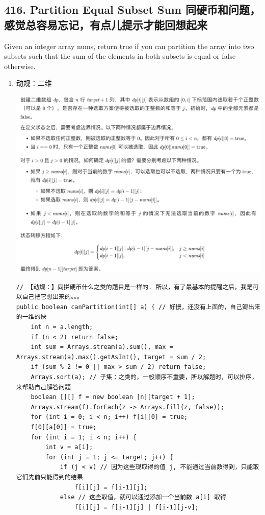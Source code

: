 \documentclass[9pt, b5paaper]{book}
\begin{document}
\subsection{416. Partition Equal Subset Sum 同硬币和问题，感觉总容易忘记，有点儿提示才能回想起来}
\label{sec-1-7-2}
Given an integer array nums, return true if you can partition the array into two subsets such that the sum of the elements in both subsets is equal or false otherwise.
\begin{enumerate}
\item 动规：二维
\label{sec-1-7-2-1}

\includegraphics[width=.9\linewidth]{./pic/dp_20230419_141627.png}
\begin{verbatim}
// 【动规：】同拼硬币什么之类的题目是一样的. 所以，有了最基本的提醒之后，我是可以自己把它想出来的。。。
public boolean canPartition(int[] a) { // 好慢，还没有上面的，自己瓣出来的一维的快
    int n = a.length;
    if (n < 2) return false;
    int sum = Arrays.stream(a).sum(), max = Arrays.stream(a).max().getAsInt(), target = sum / 2;
    if (sum % 2 != 0 || max > sum / 2) return false;
    Arrays.sort(a); // 子集：之类的，一般顺序不重要，所以解题时，可以排序，来帮助自己解答问题
    boolean [][] f = new boolean [n][target + 1];
    Arrays.stream(f).forEach(z -> Arrays.fill(z, false));
    for (int i = 0; i < n; i++) f[i][0] = true;
    f[0][a[0]] = true;
    for (int i = 1; i < n; i++) {
        int v = a[i];
        for (int j = 1; j <= target; j++) {
            if (j < v) // 因为这些现取得的值 j, 不能通过当前数得到，只能取它们先前只能得到的结果
                f[i][j] = f[i-1][j]; 
            else // 这些取值，就可以通过添加一个当前数 a[i] 取得
                f[i][j] = f[i-1][j] | f[i-1][j-v];

\end{verbatim}
\end{enumerate}
\end{document}
